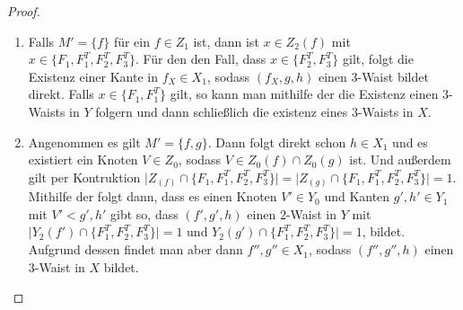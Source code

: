 \documentclass[12pt,titlepage]{article}
\begin{document}
\begin{proof}
\begin{enumerate}
  \item Falls $M'=\{f\}$ für ein $f \in Z_1$ ist, dann ist $x\in Z_2(f)$ mit $x\in \{F_1,F_1^T,F_2^T,F_3^T\}$. Für den den Fall, dass $x\in \{F_2^T,F_3^T\}$ gilt, folgt die Existenz einer Kante in $f_X\in X_1$, sodass $(f_X,g,h)$ einen 3-Waist bildet direkt. Falls $x\in \{F_1,F_1^T\}$ gilt, so kann man mithilfe der  die Existenz einen 3-Waists in $Y$ folgern und dann schließlich die existenz eines 3-Waists in $X$. 
  \item Angenommen es gilt $M'=\{f,g\}$. Dann folgt direkt schon $h \in X_1$ und es existiert ein Knoten $V \in Z_0$, sodass $V\in Z_0(f)\cap Z_0(g)$ ist.
   Und außerdem gilt per Kontruktion $\vert Z_(f)\cap \{F_1,F_1^T,F_2^T,F_3^T\}\vert=\vert Z_(g)\cap \{F_1,F_1^T,F_2^T,F_3^T\}\vert=1$.
    Mithilfe der  folgt dann, dass es einen Knoten $V'\in Y_0$ und Kanten $g',h' \in Y_1$ mit $V'<g',h'$ gibt so, dass $(f',g',h)$ einen 2-Waist in $Y$ mit $\vert Y_2(f') \cap \{F_1^T,F_2^T,F_3^T\}\vert =1$ und $Y_2(g') \cap \{F_1^T,F_2^T,F_3^T\}\vert=1$, bildet.
     Aufgrund dessen findet man aber dann $f'',g''\in X_1$, sodass $(f'',g'',h)$ einen 3-Waist in $X$ bildet.
  \end{enumerate}
  \end{proof}
\end{document}
